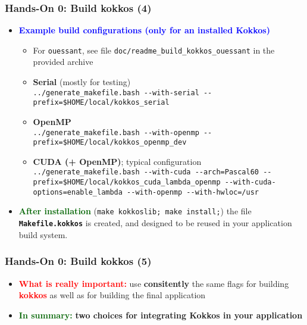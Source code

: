 \begin{frame}
  \frametitle{Hands-On 0: Build kokkos (4)}

  \begin{itemize}
  \item \textcolor{blue}{\textbf{Example build configurations (only for an installed Kokkos)}}
    {
      \small
      \begin{itemize}
      \item For \texttt{ouessant}, see file \texttt{doc/readme\_build\_kokkos\_ouessant} in the provided archive
      \item \textbf{Serial} (mostly for testing)\\
        \texttt{../generate\_makefile.bash \--\--with-serial \--\--prefix=\$HOME/local/kokkos\_serial}
      \item \textbf{OpenMP}\\
        \texttt{../generate\_makefile.bash \--\--with-openmp \--\--prefix=\$HOME/local/kokkos\_openmp\_dev}
      \item \textbf{CUDA (+ OpenMP)}; typical configuration\\
        \texttt{../generate\_makefile.bash \--\--with-cuda \--\--arch=Pascal60 \--\--prefix=\$HOME/local/kokkos\_cuda\_lambda\_openmp \--\--with-cuda-options=enable\_lambda \--\--with-openmp \--\--with-hwloc=/usr}
      \end{itemize}
    }
  \item \textcolor{darkgreen}{\textbf{After installation}} (\texttt{make kokkoslib; make install;}) the file \textbf{\texttt{Makefile.kokkos}} is created, and designed to be reused in your application build system.
  \end{itemize}
\end{frame}

\begin{frame}
  \frametitle{Hands-On 0: Build kokkos (5)}

  \begin{itemize}
  \item \textcolor{red}{\bf What is really important:} use {\bf consitently} the same flags for building \textcolor{red}{\bf kokkos} as well as for building the final application
  \item \textcolor{darkgreen}{\bf In summary:} {\bf two choices for integrating Kokkos in your application}
  \end{itemize}
  
\end{frame}

